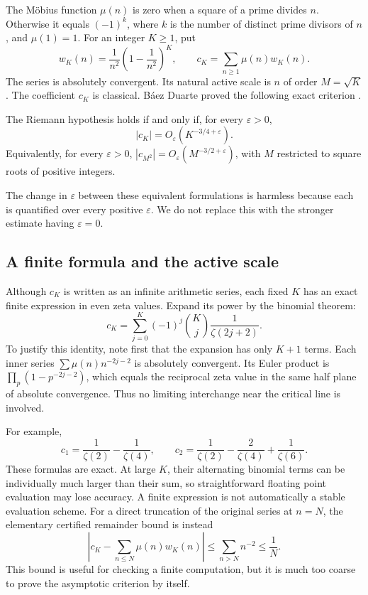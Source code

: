 The Möbius function \(\mu(n)\) is zero when a square of a prime divides \(n\). Otherwise it equals \((-1)^k\), where \(k\) is the number of distinct prime divisors of \(n\), and \(\mu(1)=1\). For an integer \(K\ge1\), put
\begin{equation}\label{rh:w}
w_K(n)=\frac1{n^2}\left(1-\frac1{n^2}\right)^K,
\qquad c_K=\sum_{n\ge1}\mu(n)w_K(n).
\end{equation}
The series is absolutely convergent. Its natural active scale is \(n\) of order \(M=\sqrt K\). The coefficient \(c_K\) is classical. Báez Duarte proved the following exact criterion \cite{BaezDuarte}.

\begin{theorem}\label{rh:bd}
The Riemann hypothesis holds if and only if, for every \(\varepsilon>0\),
\begin{equation}\label{rh:bdcriterion}
|c_K|=O_\varepsilon(K^{-3/4+\varepsilon}).
\end{equation}
Equivalently, for every \(\varepsilon>0\),
\(|c_{M^2}|=O_\varepsilon(M^{-3/2+\varepsilon})\), with \(M\) restricted to square roots of positive integers.
\end{theorem}

The change in \(\varepsilon\) between these equivalent formulations is harmless because each is quantified over every positive \(\varepsilon\). We do not replace this with the stronger estimate having \(\varepsilon=0\).

\subsection{A finite formula and the active scale}

Although \(c_K\) is written as an infinite arithmetic series, each fixed \(K\) has an exact finite expression in even zeta values. Expand its power by the binomial theorem:
\begin{equation}\label{rh:binomial}
c_K=\sum_{j=0}^K(-1)^j\binom Kj\frac1{\zeta(2j+2)}.
\end{equation}
To justify this identity, note first that the expansion has only \(K+1\) terms. Each inner series \(\sum\mu(n)n^{-2j-2}\) is absolutely convergent. Its Euler product is \(\prod_p(1-p^{-2j-2})\), which equals the reciprocal zeta value in the same half plane of absolute convergence. Thus no limiting interchange near the critical line is involved.

For example,
\[
c_1=\frac1{\zeta(2)}-\frac1{\zeta(4)},\qquad
c_2=\frac1{\zeta(2)}-\frac2{\zeta(4)}+\frac1{\zeta(6)}.
\]
These formulas are exact. At large \(K\), their alternating binomial terms can be individually much larger than their sum, so straightforward floating point evaluation may lose accuracy. A finite expression is not automatically a stable evaluation scheme. For a direct truncation of the original series at \(n=N\), the elementary certified remainder bound is instead
\[
\left|c_K-\sum_{n\le N}\mu(n)w_K(n)\right|
\le\sum_{n>N}n^{-2}\le\frac1N.
\]
This bound is useful for checking a finite computation, but it is much too coarse to prove the asymptotic criterion by itself.

